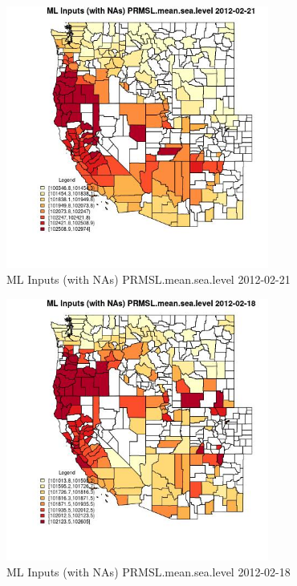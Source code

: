 \begin{figure} 
\centering  
\includegraphics[width=0.77\textwidth]{Code_Outputs/Report_ML_input_PM25_Step4_part_f_de_duplicated_aveswNAs_CountyPRMSLmeansealevelMean2012-02-21.jpg} 
\caption{\label{fig:Report_ML_input_PM25_Step4_part_f_de_duplicated_aveswNAsCountyPRMSLmeansealevelMean2012-02-21}ML Inputs (with NAs) PRMSL.mean.sea.level 2012-02-21} 
\end{figure} 
 

\begin{figure} 
\centering  
\includegraphics[width=0.77\textwidth]{Code_Outputs/Report_ML_input_PM25_Step4_part_f_de_duplicated_aveswNAs_CountyPRMSLmeansealevelMean2012-02-18.jpg} 
\caption{\label{fig:Report_ML_input_PM25_Step4_part_f_de_duplicated_aveswNAsCountyPRMSLmeansealevelMean2012-02-18}ML Inputs (with NAs) PRMSL.mean.sea.level 2012-02-18} 
\end{figure} 
 

